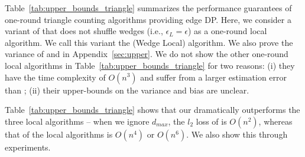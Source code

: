 Table~\ref{tab:upper_bounds_triangle} summarizes the 
performance guarantees 
of one-round triangle counting algorithms providing edge DP. 
Here, we consider a variant of \AlgWSTri{} that does not shuffle wedges (i.e., $\epsilon_L = \epsilon$) as a one-round local algorithm. 
We call this variant the \AlgWLTri{} (Wedge Local) algorithm. 
We also prove the variance of \AlgARRTri{} \cite{Imola_USENIX22} and \AlgRRTri{} \cite{Imola_USENIX21} 
in Appendix~\ref{sec:upper}. 
We do not show the other one-round local algorithms \cite{Ye_ICDE20,Ye_TKDE21} in Table~\ref{tab:upper_bounds_triangle} for two reasons: (i) they have the time complexity of $O(n^3)$ and suffer from a larger estimation error than \AlgRRTri{} \cite{Imola_USENIX22}; 
(ii) their upper-bounds on the variance and bias are unclear. 

Table~\ref{tab:upper_bounds_triangle} shows that our \AlgWSTriVR{} dramatically outperforms the three local algorithms -- when we ignore $d_{max}$, the $l_2$ loss of \AlgWSTriVR{} is $O(n^2)$, whereas that of the local algorithms is $O(n^4)$ or $O(n^6)$. 
We also show this through experiments. 




